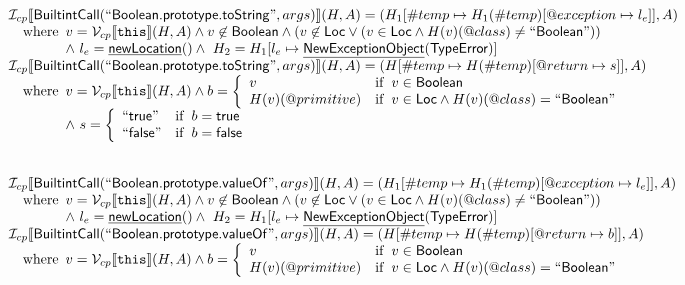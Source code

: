 \documentclass{article}
\newcommand{\SF}[1]{\mbox{\textsf{#1}}}
\newcommand{\TT}[1]{\mbox{\texttt{#1}}}
\newcommand{\wherec}[1]{{\rm where}\begin{array}[t]{l}#1\end{array}}
\newcommand{\ifc}[1]{{\rm if}\begin{array}[t]{l}#1\end{array}}
\newcommand{\I}{\mathcal{I}}
\newcommand{\V}{\mathcal{V}}
\newcommand{\lbr}{\llbracket}
\newcommand{\rbr}{\rrbracket}
\newcommand{\hf}[1]{\underline{\sf #1}}
\begin{document}
\[
\begin{array}{l}
\I _{cp}\lbr \SF{BuiltintCall}(``\SF{Boolean.prototype.toString}",args)\rbr(H,A)
  = (H_1[\#temp \mapsto H_1(\#temp)[@exception \mapsto l_e]], A)\\
\quad\wherec{
  v = \V _{cp}\lbr \TT{this}\rbr (H,A) \land v \not\in \SF{Boolean} \land
  (v \not\in \SF{Loc} \lor (v \in \SF{Loc} \land H(v)(@class) \neq ``\SF{Boolean}"))\\
  \land\ l_e = \hf{newLocation}() \land\ H_2=H_1[l_e\mapsto\hf{NewExceptionObject}(\SF{TypeError})] 
  }\\

\I _{cp}\lbr \SF{BuiltintCall}(``\SF{Boolean.prototype.toString}",args)\rbr(H,A)
  = (H[\#temp \mapsto H(\#temp)[@return \mapsto s]], A)\\
\quad\wherec{
  v = \V _{cp}\lbr \TT{this}\rbr (H,A)
  \land b = \left\{
    \begin{array}{ll}
      v & \ifc{v \in \SF{Boolean}}\\
      H(v)(@primitive) & \ifc{v \in \SF{Loc} \land H(v)(@class) = ``\SF{Boolean}"}
    \end{array}\right.\\
  \land\ s = \left\{
    \begin{array}{ll}
      ``\SF{true}" & \ifc{b = \SF{true}}\\
      ``\SF{false}" & \ifc{b = \SF{false}}
    \end{array}\right.
  }\\
\\\\


\I _{cp}\lbr \SF{BuiltintCall}(``\SF{Boolean.prototype.valueOf}",args)\rbr(H,A)
  = (H_1[\#temp \mapsto H_1(\#temp)[@exception \mapsto l_e]], A)\\
\quad\wherec{
  v = \V _{cp}\lbr \TT{this}\rbr (H,A) \land v \not\in \SF{Boolean} \land
  (v \not\in \SF{Loc} \lor (v \in \SF{Loc} \land H(v)(@class) \neq ``\SF{Boolean}"))\\
  \land\ l_e = \hf{newLocation}() \land\ H_2=H_1[l_e\mapsto\hf{NewExceptionObject}(\SF{TypeError})] 
  }\\

\I _{cp}\lbr \SF{BuiltintCall}(``\SF{Boolean.prototype.valueOf}",args)\rbr(H,A)
  = (H[\#temp \mapsto H(\#temp)[@return \mapsto b]], A)\\
\quad\wherec{
  v = \V _{cp}\lbr \TT{this}\rbr (H,A)
  \land b = \left\{
    \begin{array}{ll}
      v & \ifc{v \in \SF{Boolean}}\\
      H(v)(@primitive) & \ifc{v \in \SF{Loc} \land H(v)(@class) = ``\SF{Boolean}"}
    \end{array}\right.
  }\\
\\\\

\end{array}
\]
\end{document}

